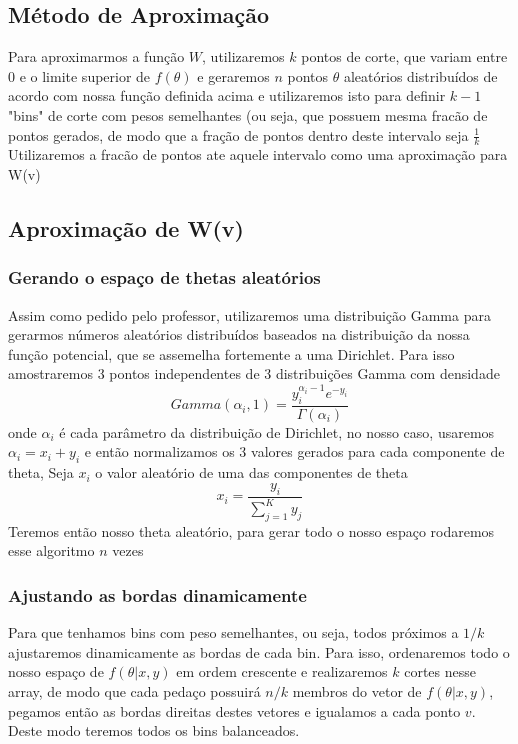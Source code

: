 \documentclass[twocolumn,amsmath,amssymb,floatfix]{revtex4}
\begin{document}
\subsection{Método de Aproximação}
\indent Para aproximarmos a função $W$, utilizaremos $k$ pontos de corte, que variam entre 0 e o limite superior de $f(\theta)$ e geraremos $n$ pontos $\theta$ aleatórios distribuídos de acordo com nossa função definida acima e utilizaremos isto para definir $k-1$ "bins" de corte com pesos semelhantes (ou seja, que possuem mesma fracão de pontos gerados, de modo que a fração de pontos dentro deste intervalo seja $\frac{1}{k}$ \\
Utilizaremos a fracão de pontos ate aquele intervalo como uma aproximação para W(v)
\subsection{Aproximação de W(v)}
\subsubsection{Gerando o espaço de thetas aleatórios}
\indent Assim como pedido pelo professor, utilizaremos uma distribuição Gamma para gerarmos números aleatórios distribuídos baseados na distribuição da nossa função potencial, que se assemelha fortemente a uma Dirichlet. Para isso amostraremos 3 pontos independentes de 3 distribuições Gamma com densidade
\begin{equation}
    Gamma(\alpha_i, 1) = \frac{y_i^{\alpha_i-1}e^{-y_i}}{\Gamma(\alpha_i)}
\end{equation}
onde $\alpha_i$ é cada parâmetro da distribuição de Dirichlet, no nosso caso, usaremos $\alpha_i = x_i + y_i$ e então normalizamos os 3 valores gerados para cada componente de theta, Seja $x_i$ o valor aleatório de uma das componentes de theta
\begin{equation}
    x_i = \frac{y_i}{\sum_{j=1}^{K}y_j}
\end{equation}
Teremos então nosso theta aleatório, para gerar todo o nosso espaço rodaremos esse algoritmo $n$ vezes
\subsubsection{Ajustando as bordas dinamicamente}
\indent Para que tenhamos bins com peso semelhantes, ou seja, todos próximos a $1/k$ ajustaremos dinamicamente as bordas de cada bin. Para isso, ordenaremos todo o nosso espaço de $f(\theta | x,y)$ em ordem crescente e realizaremos $k$ cortes nesse array, de modo que cada pedaço possuirá $n/k$ membros do vetor de $f(\theta | x,y)$, pegamos então as bordas direitas destes vetores e igualamos a cada ponto $v$.  Deste modo teremos todos os bins balanceados.
\end{document}
